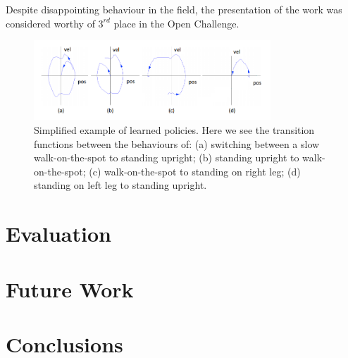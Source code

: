 Despite disappointing behaviour in the field, the presentation of the work was considered worthy of $3^{rd}$ place in the Open Challenge.


\begin{figure}[!t]
\centering
\includegraphics[width=3.5in]{img/RL_policies.png}
\caption{Simplified example of learned policies. Here we see the transition functions between the behaviours of: (a) switching between a slow walk-on-the-spot to standing upright; (b) standing upright to walk-on-the-spot; (c) walk-on-the-spot to standing on right leg; (d) standing on left leg to standing upright.}
\label{fig:policy}
\end{figure}


\section{Evaluation}
\section{Future Work}
\section{Conclusions}
